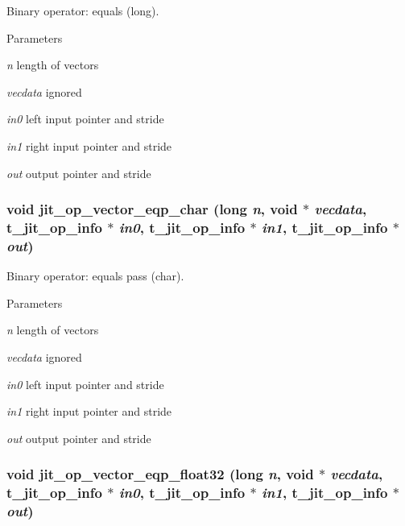 Binary operator: equals (long). 
\begin{DoxyParams}{Parameters}
\item[{\em n}]length of vectors \item[{\em vecdata}]ignored \item[{\em in0}]left input pointer and stride \item[{\em in1}]right input pointer and stride \item[{\em out}]output pointer and stride \end{DoxyParams}
\hypertarget{group__opvecmod_ga468e2155800862b807f3d5c6c506d9e8}{
\subsubsection[{jit\_\-op\_\-vector\_\-eqp\_\-char}]{\setlength{\rightskip}{0pt plus 5cm}void jit\_\-op\_\-vector\_\-eqp\_\-char (long {\em n}, \/  void $\ast$ {\em vecdata}, \/  {\bf t\_\-jit\_\-op\_\-info} $\ast$ {\em in0}, \/  {\bf t\_\-jit\_\-op\_\-info} $\ast$ {\em in1}, \/  {\bf t\_\-jit\_\-op\_\-info} $\ast$ {\em out})}}
\label{group__opvecmod_ga468e2155800862b807f3d5c6c506d9e8}


Binary operator: equals pass (char). 
\begin{DoxyParams}{Parameters}
\item[{\em n}]length of vectors \item[{\em vecdata}]ignored \item[{\em in0}]left input pointer and stride \item[{\em in1}]right input pointer and stride \item[{\em out}]output pointer and stride \end{DoxyParams}
\hypertarget{group__opvecmod_ga9b5e0c3167af07d96829bde185ccb1de}{
\subsubsection[{jit\_\-op\_\-vector\_\-eqp\_\-float32}]{\setlength{\rightskip}{0pt plus 5cm}void jit\_\-op\_\-vector\_\-eqp\_\-float32 (long {\em n}, \/  void $\ast$ {\em vecdata}, \/  {\bf t\_\-jit\_\-op\_\-info} $\ast$ {\em in0}, \/  {\bf t\_\-jit\_\-op\_\-info} $\ast$ {\em in1}, \/  {\bf t\_\-jit\_\-op\_\-info} $\ast$ {\em out})}}
\label{group__opvecmod_ga9b5e0c3167af07d96829bde185ccb1de}


